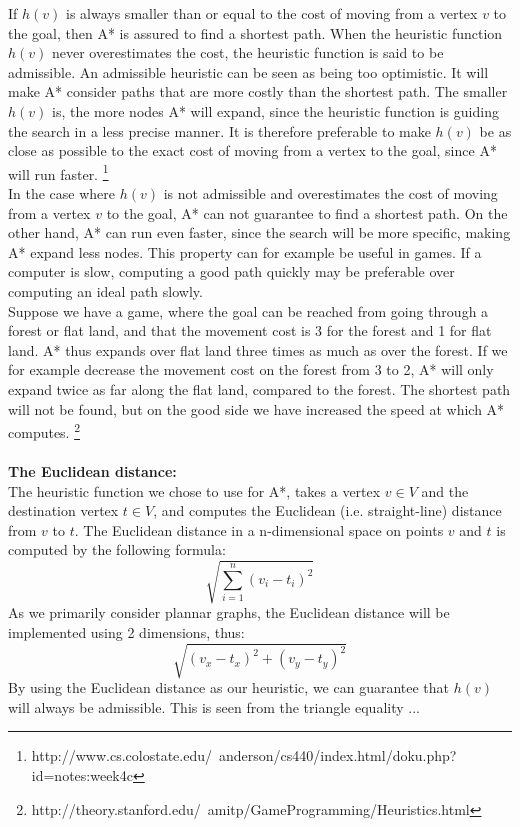 \documentclass[11pt]{article}
\begin{document}
\noindent If $h(v)$ is always smaller than or equal to the cost of moving from a vertex $v$ to the goal, then A* is assured to find a shortest path. When the  heuristic function $h(v)$ never overestimates the cost, the heuristic function is said to be admissible. An admissible heuristic can be seen as being too optimistic. It will make A* consider paths that are more costly than the shortest path. The smaller $h(v)$ is, the more nodes A* will expand, since the heuristic function is guiding the search in a less precise manner. It is therefore preferable to make $h(v)$ be as close as possible to the exact cost of moving from a vertex to the goal, since A* will run faster. \footnote{http://www.cs.colostate.edu/~anderson/cs440/index.html/doku.php?id=notes:week4c}\\

\noindent In the case where $h(v)$ is not admissible and overestimates the cost of moving from a vertex $v$ to the goal, A* can not guarantee to find a shortest path. On the other hand, A* can run even faster, since the search will be more specific, making A* expand less nodes. This property can for example be useful in games. If a computer is slow, computing a good path quickly may be preferable over computing an ideal path slowly.\\

\noindent Suppose we have a game, where the goal can be reached from going through a forest or flat land, and that the movement cost is 3 for the forest and 1 for flat land. A* thus expands over flat land three times as much as over the forest. If we for example decrease the movement cost on the forest from 3 to 2, A* will only expand twice as far along the flat land, compared to the forest. The shortest path will not be found, but on the good side we have increased the speed at which A* computes. \footnote{http://theory.stanford.edu/~amitp/GameProgramming/Heuristics.html}\\\\

\noindent \textbf{The Euclidean distance:}\\
\noindent The heuristic function we chose to use for A*, takes a vertex $v \in V$ and the destination vertex $t \in V$, and computes the Euclidean (i.e. straight-line) distance from $v$ to $t$. The Euclidean distance in a n-dimensional space on points $v$ and $t$ is computed by the following formula:\\
$$\sqrt{\displaystyle\sum_{i=1}^{n} (v_i - t_i)^2}$$
As we primarily consider plannar graphs, the Euclidean distance will be implemented using 2 dimensions, thus:\\
$$\sqrt{(v_x - t_x)^2 + (v_y - t_y)^2}$$
By using the Euclidean distance as our heuristic, we can guarantee that $h(v)$ will always be admissible. This is seen from the triangle equality ...\\
\end{document}

